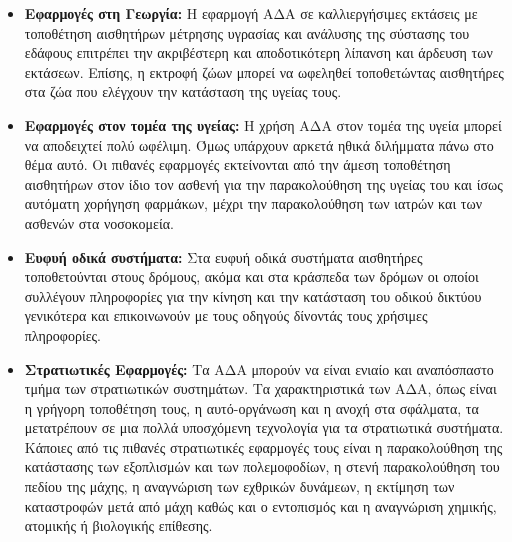 \begin{itemize}
\item \textbf{Εφαρμογές στη Γεωργία:} Η εφαρμογή ΑΔΑ σε καλλιεργήσιμες εκτάσεις με τοποθέτηση αισθητήρων μέτρησης υγρασίας και ανάλυσης της σύστασης του
εδάφους επιτρέπει την ακριβέστερη και αποδοτικότερη λίπανση και άρδευση των εκτάσεων.
Επίσης, η εκτροφή ζώων μπορεί να ωφεληθεί τοποθετώντας αισθητήρες στα ζώα που ελέγχουν την κατάσταση της υγείας τους.
\item \textbf{Εφαρμογές στον τομέα της υγείας:} Η χρήση ΑΔΑ στον τομέα της υγεία μπορεί να αποδειχτεί πολύ ωφέλιμη.
Όμως υπάρχουν αρκετά ηθικά διλήμματα πάνω στο θέμα αυτό.
Οι πιθανές εφαρμογές εκτείνονται από την άμεση τοποθέτηση αισθητήρων στον ίδιο τον ασθενή για την παρακολούθηση της υγείας του και ίσως αυτόματη χορήγηση φαρμάκων,
μέχρι την παρακολούθηση των ιατρών και των ασθενών στα νοσοκομεία.
\item \textbf{Ευφυή οδικά συστήματα:} Στα ευφυή οδικά συστήματα αισθητήρες τοποθετούνται στους δρόμους, ακόμα και στα κράσπεδα των δρόμων οι οποίοι
συλλέγουν πληροφορίες για την κίνηση και την κατάσταση του οδικού δικτύου γενικότερα και επικοινωνούν με τους οδηγούς δίνοντάς τους χρήσιμες πληροφορίες.
\item \textbf{Στρατιωτικές Εφαρμογές:} Τα ΑΔΑ μπορούν να είναι ενιαίο και αναπόσπαστο τμήμα των στρατιωτικών συστημάτων.
Τα χαρακτηριστικά των ΑΔΑ, όπως είναι η γρήγορη τοποθέτηση τους, η αυτό-οργάνωση και η ανοχή στα σφάλματα, τα μετατρέπουν σε μια πολλά υποσχόμενη τεχνολογία για τα
στρατιωτικά συστήματα.
Κάποιες από τις πιθανές στρατιωτικές εφαρμογές τους είναι η παρακολούθηση της κατάστασης των εξοπλισμών και των πολεμοφοδίων, η στενή παρακολούθηση του πεδίου της
μάχης, η αναγνώριση των εχθρικών δυνάμεων, η εκτίμηση των καταστροφών μετά από μάχη καθώς και ο εντοπισμός και η αναγνώριση χημικής, ατομικής ή βιολογικής επίθεσης.
\end{itemize}



